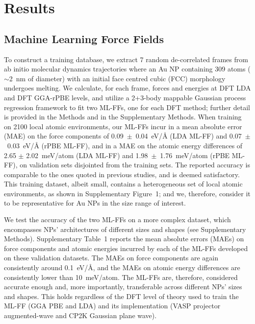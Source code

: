 \documentclass[%
aip,
 amsmath,amssymb,
 reprint,
]{revtex4-1}
\begin{document}
\section*{Results}
\label{results}
%
\subsection*{Machine Learning Force Fields}
\label{subsec:mlff_results}
%
To construct a training database, we extract 7 random de-correlated frames from ab initio molecular dynamics trajectories where an Au NP containing 309 atoms ($\sim$2~nm of diameter) with an initial face centred cubic (FCC) morphology undergoes melting.
%
We calculate, for each frame, forces and energies at DFT LDA and DFT GGA-rPBE levels, and utilize a 2+3-body mappable Gaussian process regression framework \cite{Glielmo2018, Zeni2018} to fit two ML-FFs, one for each DFT method; further detail is provided in the Methods and in the Supplementary Methods.
%
When training on 2100 local atomic environments,
our ML-FFs incur in a mean absolute error (MAE) on the force components of 0.09~$\pm$~0.04~eV/$\text{\AA}$ (LDA ML-FF) and 0.07~$\pm$~0.03~eV/$\text{\AA}$ (rPBE ML-FF), and in a MAE on the atomic energy differences of 2.65 $\pm$ 2.02~meV/atom (LDA ML-FF) and 1.98~$\pm$~1.76~meV/atom (rPBE ML-FF), on validation sets disjointed from the training sets.
%
The reported accuracy is comparable to the ones quoted in previous studies\cite{Jindal2017,Jindal2018,Jindal2020,Thorn2019,Loeffler2020,Li2018,Chiriki2017}, and is deemed satisfactory.
%
This training dataset, albeit small, contains a heterogeneous set of local atomic environments, as shown in Supplementary Figure~1; and we, therefore, consider it to be representative for Au NPs in the size range of interest.
%

We test the accuracy of the two ML-FFs on a more complex dataset, which encompasses NPs' architectures of different sizes and shapes (see Supplementary Methods).
%
Supplementary Table~1 reports the mean absolute errors (MAEs) on force components and atomic energies incurred by each of the ML-FFs developed on these validation datasets.
%
The MAEs on force components are again consistently around 0.1~eV/$\text{\AA}$, and the MAEs on atomic energy differences are consistently lower than 10~meV/atom.
%
The ML-FFs are, therefore, considered accurate enough and, more importantly, transferable across different NPs' sizes and shapes.
%
This holds regardless of the DFT level of theory used to train the ML-FF (GGA PBE and LDA) and its implementation (VASP projector augmented-wave and CP2K Gaussian plane wave).
%
\end{document}
